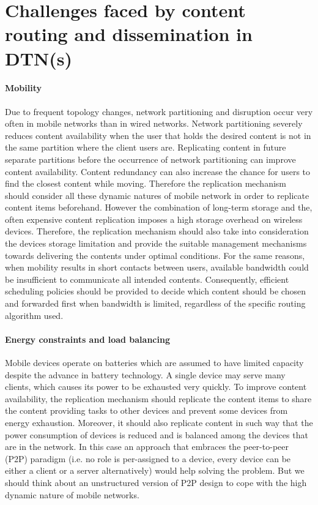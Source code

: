 \section{Challenges faced by content routing and dissemination in DTN(s)}

\paragraph{Mobility}

Due to frequent topology changes, network partitioning and disruption occur very often in mobile networks than in wired networks.
Network partitioning severely reduces content availability when the user that holds the desired content is not in the same partition where the client users are. Replicating content
in future separate partitions before the occurrence of network partitioning can improve content availability. Content redundancy can also increase the chance for users to find the
closest content while moving. Therefore the replication mechanism should consider all these dynamic natures of mobile network in order to replicate content items beforehand. However the combination of long-term storage and the, often expensive content replication imposes a high storage overhead on wireless devices. Therefore, the replication mechanism should also take into consideration the devices storage limitation and provide the suitable management mechanisms towards delivering the contents under optimal conditions. For the same reasons, when mobility results in short contacts between users, available bandwidth could be insufficient to communicate all intended contents. Consequently, efficient scheduling policies should be provided to decide which content should be chosen and forwarded first when bandwidth is limited, regardless of the specific routing algorithm used.

\paragraph{Energy constraints and load balancing}

Mobile devices operate on batteries which are assumed to have limited capacity despite the advance in battery technology. A single device may serve many clients, which causes its
power to be exhausted very quickly. To improve content availability, the replication mechanism should replicate the content items to share the content providing tasks to other devices and prevent some devices from energy exhaustion. Moreover, it should also replicate content in such way that the power consumption of devices is reduced and is balanced among the devices that are in the network. In this case an approach that embraces the peer-to-peer (P2P) paradigm (i.e. no role is per-assigned to a device, every device can be either a client or a server alternatively) would help solving the problem. But we should think about an unstructured version of P2P design to cope with the high dynamic nature of mobile networks.

